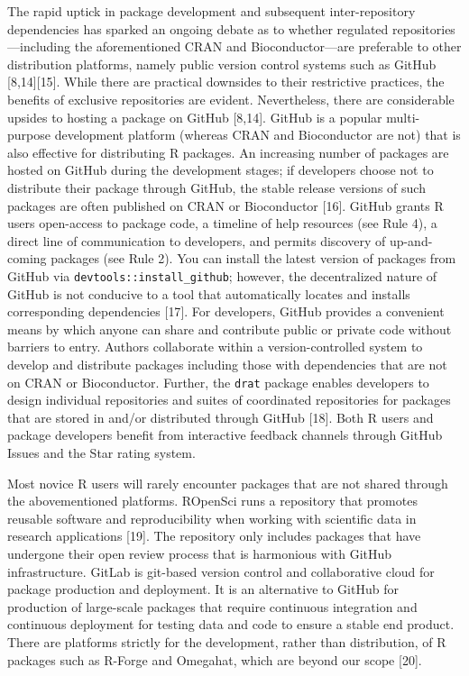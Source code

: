 \documentclass[10pt,letterpaper]{article}
\begin{document}
The rapid uptick in package development and subsequent inter-repository
dependencies has sparked an ongoing debate as to whether regulated
repositories---including the aforementioned CRAN and Bioconductor---are
preferable to other distribution platforms, namely public version
control systems such as GitHub {[}8,14{]}{[}15{]}. While there are
practical downsides to their restrictive practices, the benefits of
exclusive repositories are evident. Nevertheless, there are considerable
upsides to hosting a package on GitHub {[}8,14{]}. GitHub is a popular
multi-purpose development platform (whereas CRAN and Bioconductor are
not) that is also effective for distributing R packages. An increasing
number of packages are hosted on GitHub during the development stages;
if developers choose not to distribute their package through GitHub, the
stable release versions of such packages are often published on CRAN or
Bioconductor {[}16{]}. GitHub grants R users open-access to package
code, a timeline of help resources (see Rule 4), a direct line of
communication to developers, and permits discovery of up-and-coming
packages (see Rule 2). You can install the latest version of packages
from GitHub via \texttt{devtools::install\_github}; however, the
decentralized nature of GitHub is not conducive to a tool that
automatically locates and installs corresponding dependencies {[}17{]}.
For developers, GitHub provides a convenient means by which anyone can
share and contribute public or private code without barriers to entry.
Authors collaborate within a version-controlled system to develop and
distribute packages including those with dependencies that are not on
CRAN or Bioconductor. Further, the \texttt{drat} package enables
developers to design individual repositories and suites of coordinated
repositories for packages that are stored in and/or distributed through
GitHub {[}18{]}. Both R users and package developers benefit from
interactive feedback channels through GitHub Issues and the Star rating
system.

Most novice R users will rarely encounter packages that are not shared
through the abovementioned platforms. ROpenSci runs a repository that
promotes reusable software and reproducibility when working with
scientific data in research applications {[}19{]}. The repository only
includes packages that have undergone their open review process that is
harmonious with GitHub infrastructure. GitLab is git-based version
control and collaborative cloud for package production and deployment.
It is an alternative to GitHub for production of large-scale packages
that require continuous integration and continuous deployment for
testing data and code to ensure a stable end product. There are
platforms strictly for the development, rather than distribution, of R
packages such as R-Forge and Omegahat, which are beyond our scope
{[}20{]}.
\end{document}
